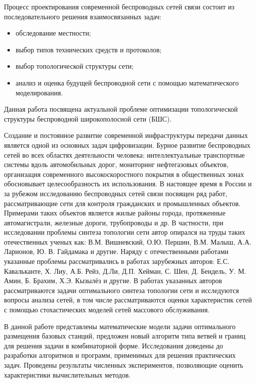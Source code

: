 Процесс проектирования современной  беспроводных сетей связи состоит из последовательного решения взаимосвязанных задач:

\begin{itemize}
    \item обследование местности;
    \item выбор типов технических средств и протоколов;
    \item выбор топологической структуры сети;
    \item анализ и оценка будущей беспроводной сети с помощью математического моделирования.
\end{itemize}

Данная работа посвящена актуальной проблеме оптимизации топологической структуры беспроводной широкополосной сети (БШС).


{\progress} Создание и постоянное развитие современной инфраструктуры передачи данных является одной из основных задач цифровизации. Бурное развитие беспроводных сетей во всех областях деятельности человека: интеллектуальные транспортные системы вдоль автомобильных дорог, мониторинг нефтегазовых объектов, организация современного высокоскоростного покрытия в общественных зонах обосновывает целесообразность их использования. В настоящее время в России и за рубежом исследованию беспроводных сетей связи посвящен ряд работ, рассматривающие сети для контроля гражданских  и промышленных объектов. Примерами таких объектов является жилые районы города, протяженные автомагистрали, железные дороги, трубопроводы и др. В частности, при исследовании проблемы синтеза топологии сети автор опирался на труды таких отечественных ученых как: В.М. Вишневский, О.Ю. Першин, В.М. Малыш,  А.А. Ларионов, Ю. В. Гайдамака и другие.
Наряду с отечественными работами указанные проблемы рассматривались в работах зарубежных авторов: Е.С. Кавальканте, Х. Лиу, А.Б. Рейз, Д.Ли, Д.П. Хейман, С. Шен, Д. Бендель, У. М. Амин, Б. Брахим, Х.Э. Кызылёз и другие. В работах указанных авторов рассматриваются задачи оптимального синтеза топологии сети и исследуются вопросы анализа сетей, в том числе рассматриваются оценки характеристик сетей с помощью стохастических моделей сетей массового обслуживания. 

В данной работе представлены математические модели задачи оптимального размещения базовых станций, предложен новый алгоритм типа ветвей и границ для решения задачи в комбинаторной форме.
Исследования доведены до разработки алгоритмов и программ, применимых для решения практических задач. Проведены результаты численных экспериментов, позволяющие оценить характеристики вычислительных методов.


